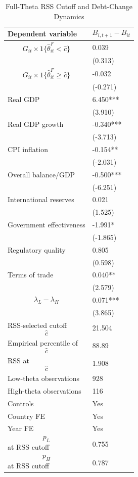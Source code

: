 \begin{table}[H]\centering
\begin{threeparttable}
\caption{Full-Theta RSS Cutoff and Debt-Change Dynamics}
\label{tab:deltaB_rss_cutoff_fulltheta}
\scriptsize
\begin{tabularx}{\textwidth}{lY}
\toprule
Dependent variable & $$B_{i,t+1}-B_{it}$$ \\
\midrule
$$G_{it}\times 1\{\widehat{\theta}^{F}_{it}<\widehat{c}\}$$ & 0.039 \\
 & (0.313) \\
$$G_{it}\times 1\{\widehat{\theta}^{F}_{it}\geq\widehat{c}\}$$ & -0.032 \\
 & (-0.271) \\
Real GDP & 6.450*** \\
 & (3.910) \\
Real GDP growth & -0.340*** \\
 & (-3.713) \\
CPI inflation & -0.154** \\
 & (-2.031) \\
Overall balance/GDP & -0.500*** \\
 & (-6.251) \\
International reserves & 0.021 \\
 & (1.525) \\
Government effectiveness & -1.991* \\
 & (-1.865) \\
Regulatory quality & 0.805 \\
 & (0.598) \\
Terms of trade & 0.040** \\
 & (2.579) \\
$$\lambda_L-\lambda_H$$ & 0.071*** \\
 & (3.865) \\
\midrule
RSS-selected cutoff $$\widehat{c}$$ & 21.504 \\
Empirical percentile of $$\widehat{c}$$ & 88.89 \\
RSS at $$\widehat{c}$$ & 1.908 \\
Low-theta observations & 928 \\
High-theta observations & 116 \\
Controls & Yes \\
Country FE & Yes \\
Year FE & Yes \\
$$p_L$$ at RSS cutoff & 0.755 \\
$$p_H$$ at RSS cutoff & 0.787 \\

\end{tabularx}
\end{threeparttable}
\end{table}
